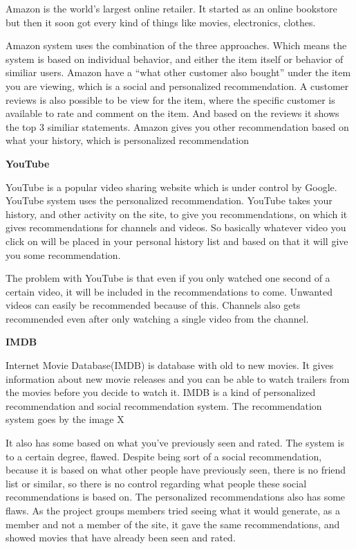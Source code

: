 Amazon is the world’s largest online retailer. It started as an online bookstore but then it soon got every kind of things like movies, electronics, clothes.

Amazon system uses the combination of the three approaches. Which means the system is based on individual behavior, and either the item itself or behavior of similiar users. Amazon have a “what other customer also bought” under the item you are viewing, which is a social and personalized recommendation. A customer reviews is also possible to be view for the item, where the specific customer is available to rate and comment on the item. And based on the reviews it shows the top 3 similiar statements. Amazon gives you other recommendation based on what your history, which is personalized recommendation

\textbf{YouTube}

YouTube is a popular video sharing website which is under control by Google. YouTube system uses the personalized recommendation. YouTube takes your history, and other activity on the site, to give you recommendations, on which it gives recommendations for channels and videos. So basically whatever video you click on will be placed in your personal history list and based on that it will give you some recommendation.

The problem with YouTube is that even if you only watched one second of a certain video, it will be included in the recommendations to come. Unwanted videos can easily be recommended because of this. Channels also gets recommended even after only watching a single video from the channel.

\textbf{IMDB}

Internet Movie Database(IMDB) is database with old to new movies. It gives information about new movie releases and you can be able to watch trailers from the movies before you decide to watch it. IMDB is a kind of  personalized recommendation and social recommendation system. The recommendation system goes by the image X

It also has some based on what you’ve previously seen and rated. The system is to a certain degree, flawed. Despite being sort of a social recommendation, because it is based on what other people have previously seen, there is no friend list or similar, so there is no control regarding what people these social recommendations is based on. The personalized recommendations also has some flaws. As the project groups members tried seeing what it would generate, as a member and not a member of the site, it gave the same recommendations, and showed movies that have already been seen and rated.

